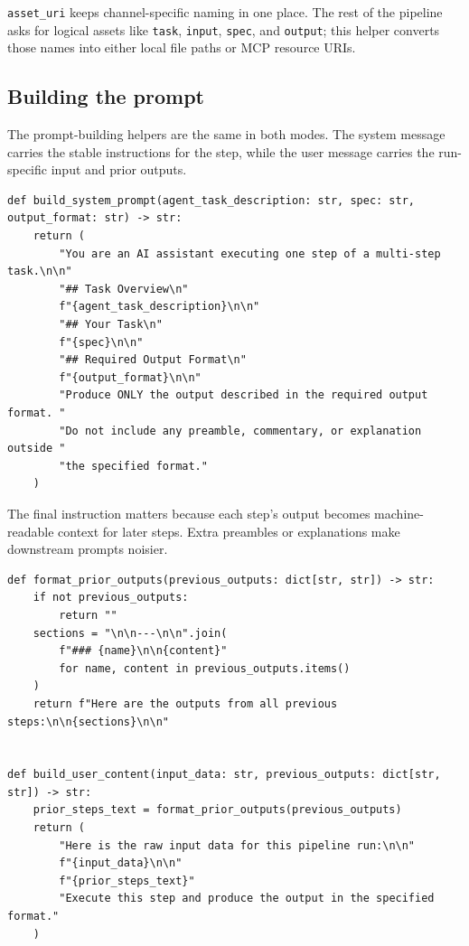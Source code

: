 \documentclass[12pt, a4paper]{article}
\begin{document}
\texttt{asset\_uri} keeps channel-specific naming in one place. The rest of the pipeline asks for logical assets like \texttt{task}, \texttt{input}, \texttt{spec}, and \texttt{output}; this helper converts those names into either local file paths or MCP resource URIs.

\subsection{Building the prompt}

The prompt-building helpers are the same in both modes. The system message carries the stable instructions for the step, while the user message carries the run-specific input and prior outputs.

\begin{lstlisting}[style=pythonstyle]
def build_system_prompt(agent_task_description: str, spec: str, output_format: str) -> str:
    return (
        "You are an AI assistant executing one step of a multi-step task.\n\n"
        "## Task Overview\n"
        f"{agent_task_description}\n\n"
        "## Your Task\n"
        f"{spec}\n\n"
        "## Required Output Format\n"
        f"{output_format}\n\n"
        "Produce ONLY the output described in the required output format. "
        "Do not include any preamble, commentary, or explanation outside "
        "the specified format."
    )
\end{lstlisting}

The final instruction matters because each step's output becomes machine-readable context for later steps. Extra preambles or explanations make downstream prompts noisier.

\begin{lstlisting}[style=pythonstyle]
def format_prior_outputs(previous_outputs: dict[str, str]) -> str:
    if not previous_outputs:
        return ""
    sections = "\n\n---\n\n".join(
        f"### {name}\n\n{content}"
        for name, content in previous_outputs.items()
    )
    return f"Here are the outputs from all previous steps:\n\n{sections}\n\n"


def build_user_content(input_data: str, previous_outputs: dict[str, str]) -> str:
    prior_steps_text = format_prior_outputs(previous_outputs)
    return (
        "Here is the raw input data for this pipeline run:\n\n"
        f"{input_data}\n\n"
        f"{prior_steps_text}"
        "Execute this step and produce the output in the specified format."
    )
\end{lstlisting}
\end{document}
